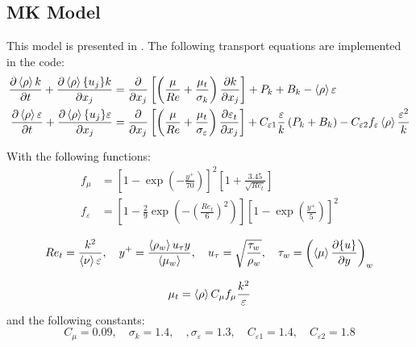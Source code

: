\subsection{MK Model}
This model is presented in \cite{myong1990new}.
The following transport equations are implemented in the code:
\begin{equation} \label{eq:ktDeng}
\begin{split}
\frac{\partial \left<{\rho}\right> k}{\partial { t}} + \frac{\partial \left<{\rho}\right> \{{u_j}\} k}{\partial {x_j}} &= \frac{\partial}{\partial x_j}\left[\left(\frac{\mu}{Re} + \frac{\mu_t}{\sigma_k}\right)\frac{\partial k}{\partial {x_j}}\right] + P_{k} + B_k- \left<{\rho}\right>\varepsilon \\
\frac{\partial  \left<{\rho}\right> \varepsilon}{\partial {t}} + \frac{\partial  \left<{\rho}\right> \{{u_j}\} \varepsilon}{\partial { x_j}} &= \frac{\partial}{\partial x_j}\left[ \left(\frac{\mu}{Re} + \frac{\mu_t}{\sigma_{\varepsilon}}\right)\frac{\partial  \varepsilon_t}{\partial {x_j}}\right] + C_{\varepsilon1}\frac{\varepsilon}{k}\left(P_k+B_k\right)  -C_{\varepsilon2} f_{\varepsilon}\left<{\rho}\right>\frac{\varepsilon^2}{k}   
\end{split}
\end{equation}

With the following functions:
\begin{equation}
\begin{split}
    f_\mu &= \left[1-\exp\left(-\frac{y^+}{70}\right)\right]^2\left[1+\frac{3.45}{\sqrt{Re_t}}\right] \\
    f_\varepsilon  &=\left[1-\frac{2}{9}\exp\left(-\left(\frac{Re_t}{6}\right)^2\right)\right] \left[1-\exp\left(\frac{y^+}{5}\right)\right]^2 
\end{split}
\end{equation}

\begin{equation}
Re_t = \frac{k^2}{\left<{\nu}\right> \varepsilon}, \quad y^+ =  \frac{\left<{\rho_w}\right> u_\tau y }{\left<{\mu_w}\right>}, \quad u_\tau = \sqrt{\frac{\tau_w}{\rho_w}}, \quad \tau_w = \left(\left<{\mu}\right>\frac{\partial  \{{u}\}}{\partial {y}}\right)_w
\end{equation}

\begin{equation}
\mu_t = \left<{\rho}\right> C_\mu f_\mu \frac{k^2}{\varepsilon}
\end{equation}
and the following constants:
\begin{equation}
C_\mu = 0.09, \quad \sigma_k = 1.4, \quad, \sigma_\varepsilon = 1.3, \quad C_{\varepsilon1} = 1.4, \quad C_{\varepsilon2}=1.8
\end{equation}
